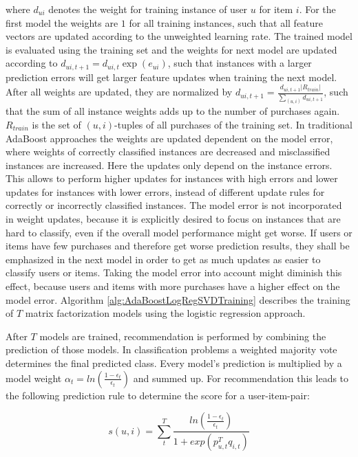 \documentclass[10pt]{reportMaster}
\begin{document}
where $d_{ui}$ denotes the weight for training instance of user $u$ for item $i$.
For the first model the weights are $1$ for all training instances, such that all feature vectors are updated according to the unweighted learning rate.
The trained model is evaluated using the training set and the weights for next model are updated according to $d_{ui,t+1} = d_{ui,t} \exp(e_{ui})$, such that instances with a larger prediction errors will get larger feature updates when training the next model.
After all weights are updated, they are normalized by $d_{ui,t+1} = \frac{d_{ui,t+1} |R_{train}|}{\sum_{(u,i)}{d_{ui,t+1}}}$, such that the sum of all instance weights adds up to the number of purchases again.
$R_{train}$ is the set of $(u,i)$-tuples of all purchases of the training set.
In traditional AdaBoost approaches the weights are updated dependent on the model error, where weights of correctly classified instances are decreased and misclassified instances are increased.
Here the updates only depend on the instance errors.
This allows to perform higher updates for instances with high errors and lower updates for instances with lower errors, instead of different update rules for correctly or incorrectly classified instances. 
The model error is not incorporated in weight updates, because it is explicitly desired to focus on instances that are hard to classify, even if the overall model performance might get worse.
If users or items have few purchases and therefore get worse prediction results, they shall be emphasized in the next model in order to get as much updates as easier to classify users or items.
Taking the model error into account might diminish this effect, because users and items with more purchases have a higher effect on the model error.
Algorithm \ref{alg:AdaBoostLogRegSVDTraining} describes the training of $T$ matrix factorization models using the logistic regression approach.

After $T$ models are trained, recommendation is performed by combining the prediction of those models.
In classification problems a weighted majority vote determines the final predicted class.
Every model's prediction is multiplied by a model weight $\alpha_t = ln(\frac{1-\epsilon_t}{\epsilon_t})$ and summed up.
For recommendation this leads to the following prediction rule to determine the score for a user-item-pair:

\begin{equation}
	\label{eq:adaBoostPredRule}
	s(u,i) = \sum_t^T{\frac{ln(\frac{1 - \epsilon_t}{\epsilon_t})}{1 + exp(p_{u,t}^Tq_{i,t})}}
\end{equation}
\end{document}
